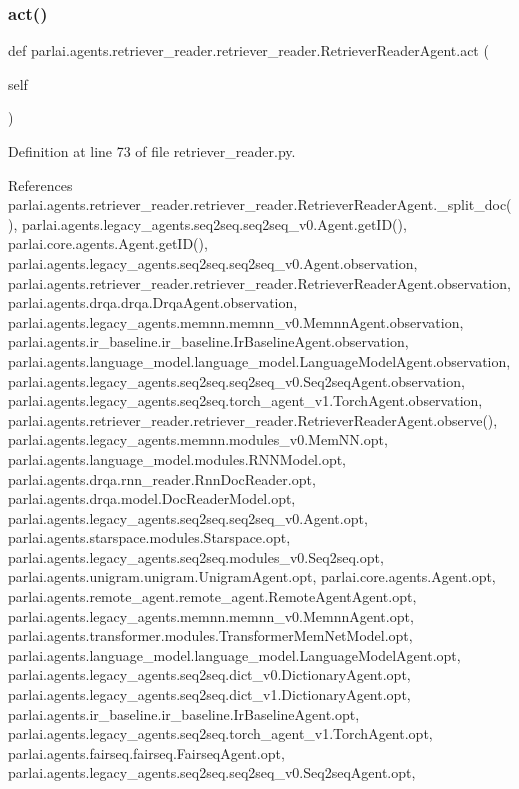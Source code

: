\subsubsection{\texorpdfstring{act()}{act()}}
{\footnotesize\ttfamily def parlai.\+agents.\+retriever\+\_\+reader.\+retriever\+\_\+reader.\+Retriever\+Reader\+Agent.\+act (\begin{DoxyParamCaption}\item[{}]{self }\end{DoxyParamCaption})}



Definition at line 73 of file retriever\+\_\+reader.\+py.



References parlai.\+agents.\+retriever\+\_\+reader.\+retriever\+\_\+reader.\+Retriever\+Reader\+Agent.\+\_\+split\+\_\+doc(), parlai.\+agents.\+legacy\+\_\+agents.\+seq2seq.\+seq2seq\+\_\+v0.\+Agent.\+get\+I\+D(), parlai.\+core.\+agents.\+Agent.\+get\+I\+D(), parlai.\+agents.\+legacy\+\_\+agents.\+seq2seq.\+seq2seq\+\_\+v0.\+Agent.\+observation, parlai.\+agents.\+retriever\+\_\+reader.\+retriever\+\_\+reader.\+Retriever\+Reader\+Agent.\+observation, parlai.\+agents.\+drqa.\+drqa.\+Drqa\+Agent.\+observation, parlai.\+agents.\+legacy\+\_\+agents.\+memnn.\+memnn\+\_\+v0.\+Memnn\+Agent.\+observation, parlai.\+agents.\+ir\+\_\+baseline.\+ir\+\_\+baseline.\+Ir\+Baseline\+Agent.\+observation, parlai.\+agents.\+language\+\_\+model.\+language\+\_\+model.\+Language\+Model\+Agent.\+observation, parlai.\+agents.\+legacy\+\_\+agents.\+seq2seq.\+seq2seq\+\_\+v0.\+Seq2seq\+Agent.\+observation, parlai.\+agents.\+legacy\+\_\+agents.\+seq2seq.\+torch\+\_\+agent\+\_\+v1.\+Torch\+Agent.\+observation, parlai.\+agents.\+retriever\+\_\+reader.\+retriever\+\_\+reader.\+Retriever\+Reader\+Agent.\+observe(), parlai.\+agents.\+legacy\+\_\+agents.\+memnn.\+modules\+\_\+v0.\+Mem\+N\+N.\+opt, parlai.\+agents.\+language\+\_\+model.\+modules.\+R\+N\+N\+Model.\+opt, parlai.\+agents.\+drqa.\+rnn\+\_\+reader.\+Rnn\+Doc\+Reader.\+opt, parlai.\+agents.\+drqa.\+model.\+Doc\+Reader\+Model.\+opt, parlai.\+agents.\+legacy\+\_\+agents.\+seq2seq.\+seq2seq\+\_\+v0.\+Agent.\+opt, parlai.\+agents.\+starspace.\+modules.\+Starspace.\+opt, parlai.\+agents.\+legacy\+\_\+agents.\+seq2seq.\+modules\+\_\+v0.\+Seq2seq.\+opt, parlai.\+agents.\+unigram.\+unigram.\+Unigram\+Agent.\+opt, parlai.\+core.\+agents.\+Agent.\+opt, parlai.\+agents.\+remote\+\_\+agent.\+remote\+\_\+agent.\+Remote\+Agent\+Agent.\+opt, parlai.\+agents.\+legacy\+\_\+agents.\+memnn.\+memnn\+\_\+v0.\+Memnn\+Agent.\+opt, parlai.\+agents.\+transformer.\+modules.\+Transformer\+Mem\+Net\+Model.\+opt, parlai.\+agents.\+language\+\_\+model.\+language\+\_\+model.\+Language\+Model\+Agent.\+opt, parlai.\+agents.\+legacy\+\_\+agents.\+seq2seq.\+dict\+\_\+v0.\+Dictionary\+Agent.\+opt, parlai.\+agents.\+legacy\+\_\+agents.\+seq2seq.\+dict\+\_\+v1.\+Dictionary\+Agent.\+opt, parlai.\+agents.\+ir\+\_\+baseline.\+ir\+\_\+baseline.\+Ir\+Baseline\+Agent.\+opt, parlai.\+agents.\+legacy\+\_\+agents.\+seq2seq.\+torch\+\_\+agent\+\_\+v1.\+Torch\+Agent.\+opt, parlai.\+agents.\+fairseq.\+fairseq.\+Fairseq\+Agent.\+opt, parlai.\+agents.\+legacy\+\_\+agents.\+seq2seq.\+seq2seq\+\_\+v0.\+Seq2seq\+Agent.\+opt, 